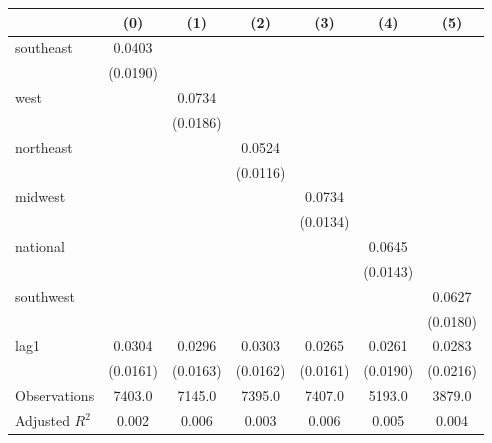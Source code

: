 \begin{tabular}{lcccccc}
\toprule
 & (0) & (1) & (2) & (3) & (4) & (5) \\
\midrule
southeast & 0.0403 &  &  &  &  &  \\
\vspace{0.2cm}
 & (0.0190) &  &  &  &  &  \\
west &  & 0.0734 &  &  &  &  \\
\vspace{0.2cm}
 &  & (0.0186) &  &  &  &  \\
northeast &  &  & 0.0524 &  &  &  \\
\vspace{0.2cm}
 &  &  & (0.0116) &  &  &  \\
midwest &  &  &  & 0.0734 &  &  \\
\vspace{0.2cm}
 &  &  &  & (0.0134) &  &  \\
national &  &  &  &  & 0.0645 &  \\
\vspace{0.2cm}
 &  &  &  &  & (0.0143) &  \\
southwest &  &  &  &  &  & 0.0627 \\
\vspace{0.2cm}
 &  &  &  &  &  & (0.0180) \\
lag1 & 0.0304 & 0.0296 & 0.0303 & 0.0265 & 0.0261 & 0.0283 \\
\vspace{0.2cm}
 & (0.0161) & (0.0163) & (0.0162) & (0.0161) & (0.0190) & (0.0216) \\
\midrule
Observations & 7403.0 & 7145.0 & 7395.0 & 7407.0 & 5193.0 & 3879.0 \\
Adjusted $R^2$ & 0.002 & 0.006 & 0.003 & 0.006 & 0.005 & 0.004 \\
\bottomrule
\end{tabular}